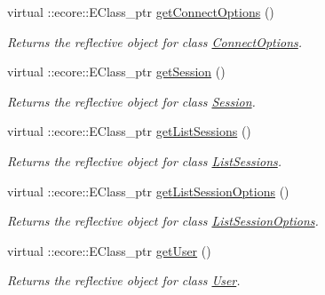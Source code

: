 \begin{DoxyCompactItemize}
\item 
virtual ::ecore::EClass\_\-ptr \hyperlink{classUMS__Data_1_1UMS__DataPackage_ab6f03fd5f7df66fcd8df01e4fcb09ab4}{getConnectOptions} ()
\begin{DoxyCompactList}\small\item\em Returns the reflective object for class \hyperlink{classUMS__Data_1_1ConnectOptions}{ConnectOptions}. \item\end{DoxyCompactList}\item 
virtual ::ecore::EClass\_\-ptr \hyperlink{classUMS__Data_1_1UMS__DataPackage_a8776fcd27e24075801eb6af8e8e12389}{getSession} ()
\begin{DoxyCompactList}\small\item\em Returns the reflective object for class \hyperlink{classUMS__Data_1_1Session}{Session}. \item\end{DoxyCompactList}\item 
virtual ::ecore::EClass\_\-ptr \hyperlink{classUMS__Data_1_1UMS__DataPackage_a1740fd16c5114c9687bdc928b3a0b7b8}{getListSessions} ()
\begin{DoxyCompactList}\small\item\em Returns the reflective object for class \hyperlink{classUMS__Data_1_1ListSessions}{ListSessions}. \item\end{DoxyCompactList}\item 
virtual ::ecore::EClass\_\-ptr \hyperlink{classUMS__Data_1_1UMS__DataPackage_a24e607e8f36cf3b8cd1d71760cddba13}{getListSessionOptions} ()
\begin{DoxyCompactList}\small\item\em Returns the reflective object for class \hyperlink{classUMS__Data_1_1ListSessionOptions}{ListSessionOptions}. \item\end{DoxyCompactList}\item 
virtual ::ecore::EClass\_\-ptr \hyperlink{classUMS__Data_1_1UMS__DataPackage_ad24c3ecc49c0e2a490b1f9210f67c323}{getUser} ()
\begin{DoxyCompactList}\small\item\em Returns the reflective object for class \hyperlink{classUMS__Data_1_1User}{User}. \item\end{DoxyCompactList}\item 

\end{DoxyCompactItemize}
